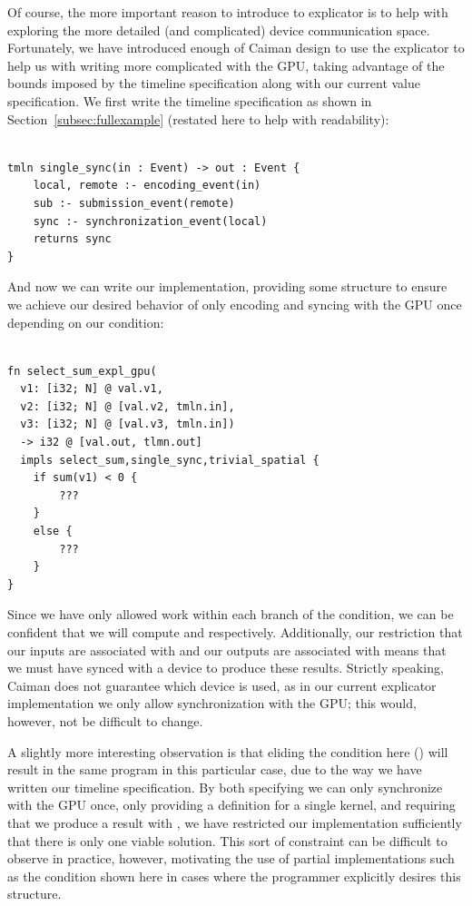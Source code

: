 Of course, the more important reason to introduce to explicator is to help with exploring the more detailed (and complicated) device communication space.  Fortunately, we have introduced enough of Caiman design to use the explicator to help us with writing more complicated with the GPU, taking advantage of the bounds imposed by the timeline specification along with our current value specification.  We first write the timeline specification as shown in Section~\ref{subsec:fullexample} (restated here to help with readability):
%
\begin{lstlisting}

tmln single_sync(in : Event) -> out : Event {
    local, remote :- encoding_event(in)
    sub :- submission_event(remote)
    sync :- synchronization_event(local)
    returns sync
}
\end{lstlisting}
%
And now we can write our implementation, providing some structure to ensure we achieve our desired behavior of only encoding and syncing with the GPU once depending on our condition:
%
\begin{lstlisting}

fn select_sum_expl_gpu(
  v1: [i32; N] @ val.v1, 
  v2: [i32; N] @ [val.v2, tmln.in], 
  v3: [i32; N] @ [val.v3, tmln.in]) 
  -> i32 @ [val.out, tlmn.out] 
  impls select_sum,single_sync,trivial_spatial {
    if sum(v1) < 0 {
        ???
    }
    else {
        ???
    } 
}
\end{lstlisting}
%
Since we have only allowed work within each branch of the condition, we can be confident that we will compute  and  respectively.  Additionally, our restriction that our inputs are associated with  and our outputs are associated with  means that we must have synced with a device to produce these results.  Strictly speaking, Caiman does not guarantee which device is used, as in our current explicator implementation we only allow synchronization with the GPU; this would, however, not be difficult to change.

A slightly more interesting observation is that eliding the condition here () will result in the same program in this particular case, due to the way we have written our timeline specification.  By both specifying we can only synchronize with the GPU once, only providing a definition for a single  kernel, and requiring that we produce a result with , we have restricted our implementation sufficiently that there is only one viable solution.  This sort of constraint can be difficult to observe in practice, however, motivating the use of partial implementations such as the condition shown here in cases where the programmer explicitly desires this structure.

